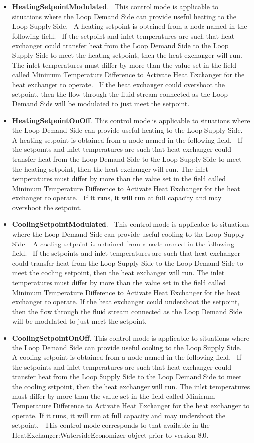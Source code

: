 \begin{itemize}
\item
  \textbf{HeatingSetpointModulated}.~ This control mode is applicable to situations where the Loop Demand Side can provide useful heating to the Loop Supply Side.~ A heating setpoint is obtained from a node named in the following field.~ If the setpoint and inlet temperatures are such that heat exchanger could transfer heat from the Loop Demand Side to the Loop Supply Side to meet the heating setpoint, then the heat exchanger will run.~ The inlet temperatures must differ by more than the value set in the field called Minimum Temperature Difference to Activate Heat Exchanger for the heat exchanger to operate. ~If the heat exchanger could overshoot the setpoint, then the flow through the fluid stream connected as the Loop Demand Side will be modulated to just meet the setpoint.
\item
  \textbf{HeatingSetpointOnOff}. This control mode is applicable to situations where the Loop Demand Side can provide useful heating to the Loop Supply Side.~ A heating setpoint is obtained from a node named in the following field.~ If the setpoints and inlet temperatures are such that heat exchanger could transfer heat from the Loop Demand Side to the Loop Supply Side to meet the heating setpoint, then the heat exchanger will run. The inlet temperatures must differ by more than the value set in the field called Minimum Temperature Difference to Activate Heat Exchanger for the heat exchanger to operate. ~If it runs, it will run at full capacity and may overshoot the setpoint.
\item
  \textbf{CoolingSetpointModulated}.~ This control mode is applicable to situations where the Loop Demand Side can provide useful cooling to the Loop Supply Side.~ A cooling setpoint is obtained from a node named in the following field.~ If the setpoints and inlet temperatures are such that heat exchanger could transfer heat from the Loop Supply Side to the Loop Demand Side to meet the cooling setpoint, then the heat exchanger will run. The inlet temperatures must differ by more than the value set in the field called Minimum Temperature Difference to Activate Heat Exchanger for the heat exchanger to operate. If the heat exchanger could undershoot the setpoint, then the flow through the fluid stream connected as the Loop Demand Side will be modulated to just meet the setpoint.
\item
  \textbf{CoolingSetpointOnOff}. This control mode is applicable to situations where the Loop Demand Side can provide useful cooling to the Loop Supply Side.~ A cooling setpoint is obtained from a node named in the following field.~ If the setpoints and inlet temperatures are such that heat exchanger could transfer heat from the Loop Supply Side to the Loop Demand Side to meet the cooling setpoint, then the heat exchanger will run. The inlet temperatures must differ by more than the value set in the field called Minimum Temperature Difference to Activate Heat Exchanger for the heat exchanger to operate. If it runs, it will run at full capacity and may undershoot the setpoint.~ This control mode corresponds to that available in the HeatExchanger:WatersideEconomizer object prior to version 8.0.

\end{itemize}
